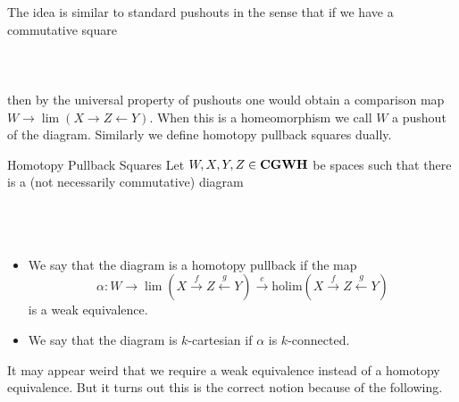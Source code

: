 \documentclass[a4paper]{article}
\begin{document}
The idea is similar to standard pushouts in the sense that if we have a commutative square \\~\\
\\~\\
then by the universal property of pushouts one would obtain a comparison map $W\to\lim(X\rightarrow Z\leftarrow Y)$. When this is a homeomorphism we call $W$ a pushout of the diagram. Similarly we define homotopy pullback squares dually. 

\begin{defn}{Homotopy Pullback Squares}{} Let $W,X,Y,Z\in\bold{CGWH}$ be spaces such that there is a (not necessarily commutative) diagram \\~\\
\\~\\
\begin{itemize}
\item We say that the diagram is a homotopy pullback if the map $$\alpha:W\to\lim(X\overset{f}{\rightarrow}Z\overset{g}{\leftarrow}Y)\overset{c}{\longrightarrow}\text{holim}(X\overset{f}{\rightarrow}Z\overset{g}{\leftarrow}Y)$$ is a weak equivalence. 
\item We say that the diagram is $k$-cartesian if $\alpha$ is $k$-connected. 
\end{itemize}
\end{defn}

It may appear weird that we require a weak equivalence instead of a homotopy equivalence. But it turns out this is the correct notion because of the following. 
\end{document}
